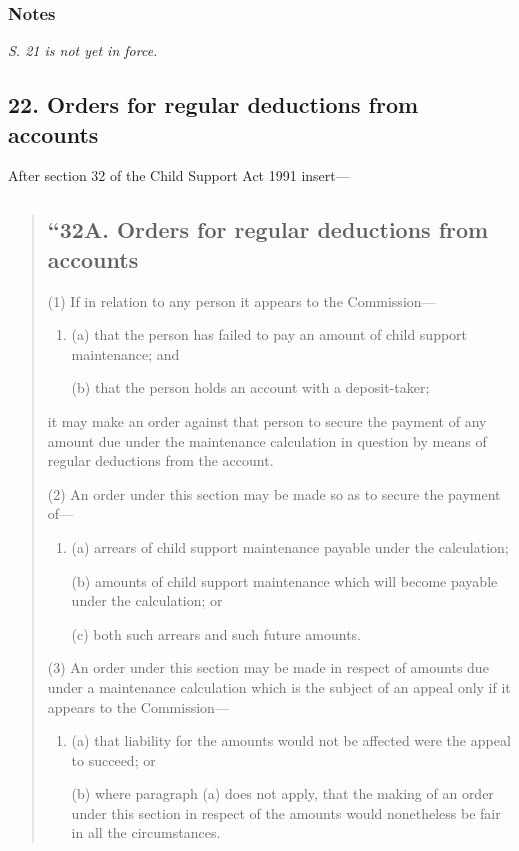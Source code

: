 \documentclass[a4paper]{article}
\newcommand\amendment[1]{\subsubsection*{Notes}{\itshape\frenchspacing\footnotesize #1 \par}}
\begin{document}
\amendment{S. 21 is not yet in force.}

\subsection{22. Orders for regular deductions from accounts}

After section 32 of the Child Support Act 1991 insert---
\begin{quotation}
\subsection*{``32A. Orders for regular deductions from accounts}

(1) If in relation to any person it appears to the Commission---
\begin{enumerate}\item[]
(a) that the person has failed to pay an amount of child support maintenance;
and

(b) that the person holds an account with a deposit-taker;
\end{enumerate}
it may make an order against that person to secure the payment of any amount due under the maintenance calculation in question by means of regular deductions from the account.

(2) An order under this section may be made so as to secure the payment of---
\begin{enumerate}\item[]
(a) arrears of child support maintenance payable under the calculation;

(b) amounts of child support maintenance which will become payable under the
calculation; or

(c) both such arrears and such future amounts.
\end{enumerate}

\begin{sloppypar}
(3) An order under this section may be made in respect of amounts due under a maintenance calculation which is the subject of an appeal only if it appears to the Commission---
\end{sloppypar}
\begin{enumerate}\item[]
(a) that liability for the amounts would not be affected were the appeal to succeed;
or

(b) where paragraph (a) does not apply, that the making of an order under this
section in respect of the amounts would nonetheless be fair in all the
circumstances.
\end{enumerate}


\end{quotation}
\end{document}
